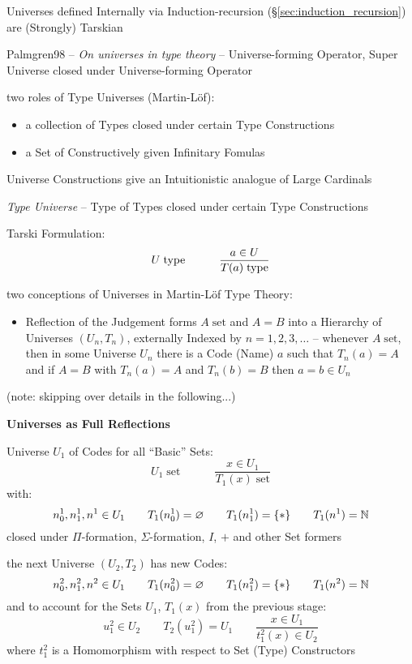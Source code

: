 Universes defined Internally via Induction-recursion
(\S\ref{sec:induction_recursion}) are (Strongly) Tarskian


\asterism

\begingroup %

\newcommand{\sett}{\;\mathrm{set}}


Palmgren98 -- \emph{On universes in type theory} -- Universe-forming
Operator, Super Universe closed under Universe-forming Operator

two roles of Type Universes (Martin-L\"of):
\begin{itemize}
  \item a collection of Types closed under certain Type Constructions
  \item a Set of Constructively given Infinitary Fomulas
\end{itemize}

Universe Constructions give an Intuitionistic analogue of Large
Cardinals

\emph{Type Universe} -- Type of Types closed under certain Type
Constructions

Tarski Formulation:
\[
  U \;\mathrm{type} \quad\quad\quad \frac{a \in U}{T(a) \;\mathrm{type}}
\]

two conceptions of Universes in Martin-L\"of Type Theory:
\begin{itemize}
  \item Reflection of the Judgement forms $A \sett$ and $A = B$ into a
    Hierarchy of Universes $(U_n,T_n)$, externally Indexed by $n =
    1,2,3,\ldots$ -- whenever $A \sett$, then in some Universe $U_n$
    there is a Code (Name) $a$ such that $T_n(a) = A$ and if $A = B$
    with $T_n(a) = A$ and $T_n(b) = B$ then $a = b \in U_n$
\end{itemize}

(note: skipping over details in the following...) %


\textbf{Universes as Full Reflections}

Universe $U_1$ of Codes for all ``Basic'' Sets:
\[
  U_1 \sett \quad\quad\quad \frac{x \in U_1}{T_1(x) \sett}
\]
with:
\[
  n_0^1,n_1^1,n^1 \in U_1 \quad\quad T_1(n_0^1) = \varnothing
    \quad\quad T_1(n_1^1) = \{*\} \quad\quad T_1(n^1) = \mathbb{N}
\]
closed under $\Pi$-formation, $\Sigma$-formation, $I$, $+$ and other
Set formers

the next Universe $(U_2,T_2)$ has new Codes:
\[
  n_0^2,n_1^2,n^2 \in U_1 \quad\quad T_1(n_0^2) = \varnothing
    \quad\quad T_1(n_1^2) = \{*\} \quad\quad T_1(n^2) = \mathbb{N}
\]
and to account for the Sets $U_1$, $T_1(x)$ from the previous stage:
\[
  u_1^2 \in U_2 \quad\quad T_2(u^2_1)=U_1 \quad\quad
    \frac{x \in U_1}{t_1^2(x) \in U_2}
\]
where $t_1^2$ is a Homomorphism with respect to Set (Type)
Constructors

